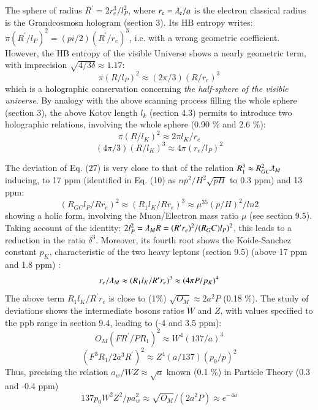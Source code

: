 \documentclass[twoside,draft]{article}
\begin{document}
\begin{sloppypar}
The sphere of radius $R^{\prime} = 2r_e^3 / l_P^ 2$, where $r_e = \lambdabar_e /a $ is the electron classical radius is the Grandcosmosn hologram (section 3). Its HB entropy writes: $\pi(R^{\prime}/l_P)^2 = (pi/2)(R^{\prime}/r_e)^3 $, i.e. with a wrong geometric coefficient. However, the HB entropy of the visible Universe shows a nearly geometric term, with imprecision $\sqrt{4/3\delta} \approx 1.17$:
\begin{equation}
\pi(R/l_P)^2 \approx (2\pi/3)(R/r_e)^3 
\end{equation}
which is a holographic conservation concerning \textit{the half-sphere of the visible universe}. By analogy with the above scanning process filling the whole sphere (section 3), the above Kotov length $l_k$ (section 4.3) permits to introduce two holographic relations, involving the whole sphere (0.90 \% and 2.6 \%):
\begin{equation}
\pi(R/l_K)^2 \approx 2\pi l_K/r_e 
\end{equation}
\begin{equation}
(4\pi/3)(R/l_K)^3 \approx 4\pi (r_e/l_P)^2 
\end{equation}

The deviation of Eq. (27) is very close to that of the relation $R_1^3 \approx R_{GC}^2 \lambdabar_M$ inducing, to 17 ppm (identified in Eq. (10) as $np^2/H^2\sqrt{pH}$ to 0.3 ppm) and 13 ppm: 
\begin{equation}
 (R_{GC}l_P/Rr_e)^2 \approx (R_1l_K/Rr_e)^3 \approx \mu^{35}(p/H)^2/ln2
\end{equation}
showing a holic form, involving the Muon/Electron mass ratio $\mu$ (see section 9.5).
Taking account of the identity: $2l_P^2 = \lambdabar_M R = (R^{\prime}r_e)^2/(R_GC)l_P)^2$, this leads to a reduction in the ratio $\delta^3$. Moreover, its fourth root shows the Koide-Sanchez constant $p_K$, characteristic of the two heavy leptons (section 9.5) (above 17 ppm and 1.8 ppm) :
\begin{equation}
r_e/\lambdabar_M \approx (R_1l_K/R^{\prime}r_e)^3 \approx (4\pi P/p_K)^4
\end{equation}
The above term $R_1l_K/R^{\prime}r_e$ is close to (1\%) $\sqrt{O_M} \approx 2a^2P$ (0.18 \%). The study of deviations shows the intermediate bosons ratios $W$ and $Z$, with values specified to the ppb range in section 9.4, leading to (-4 and 3.5 ppm):
\begin{equation}
O_M (FR^{\prime}/PR_1)^2 \approx W^4 (137/a)^3
\end{equation}
\begin{equation}
 (F^3R_1 / 2 a^3R^{\prime})^2 \approx Z^4 (a/137)(p_0/p)^2
\end{equation}
Thus, precising the relation $a_w/WZ \approx \sqrt{a}$ known (0.1 \%) in Particle Theory (0.3 and -0.4 ppm)
\begin{equation}
137 p_0 W^2 Z^2/p a_w^2 \approx \sqrt{O_M}/(2a^2 P) \approx e^{-4a}
\end{equation}   


\end{sloppypar}
\end{document}
